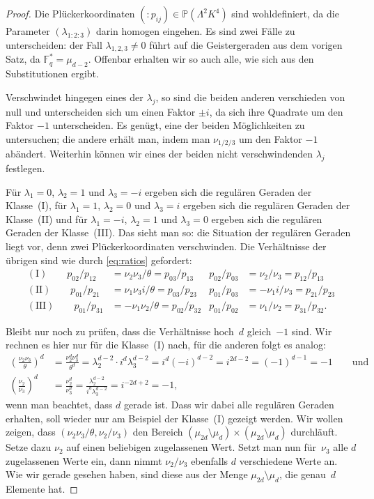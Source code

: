 \begin{proof}
Die Plückerkoordinaten $(:\!p_{ij}) \in \mathbb P(\Lambda^2 K^4)$ sind wohldefiniert, da die Parameter $(\lambda_{1:2:3})$ darin homogen eingehen. Es sind zwei Fälle zu unterscheiden: der Fall $\lambda_{1,2,3} \neq 0$ führt auf die Geistergeraden aus dem vorigen Satz, da $\mathbb F_q^* = \mu_{d-2}$. Offenbar erhalten wir so auch alle, wie sich aus den Substitutionen ergibt.

Verschwindet hingegen eines der $\lambda_j$, so sind die beiden anderen verschieden von null und unterscheiden sich um einen Faktor $\pm i$, da sich ihre Quadrate um den Faktor $-1$ unterscheiden. Es genügt, eine der beiden Möglichkeiten zu untersuchen; die andere erhält man, indem man $\nu_{1/2/3}$ um den Faktor $-1$ abändert. Weiterhin können wir eines der beiden nicht verschwindenden $\lambda_j$ festlegen.

Für $\lambda_1 = 0$, $\lambda_2 = 1$ und $\lambda_3 = -i$ ergeben sich die regulären Geraden der Klasse~(I), für $\lambda_1 = 1$, $\lambda_2 = 0$ und $\lambda_3 = i$ ergeben sich die regulären Geraden der Klasse~(II) und für $\lambda_1 = -i$, $\lambda_2 = 1$ und $\lambda_3 = 0$ ergeben sich die regulären Geraden der Klasse~(III). Das sieht man so: die Situation der regulären Geraden liegt vor, denn zwei Plückerkoordinaten verschwinden. Die Verhältnisse der übrigen sind wie durch \eqref{eq:ratios} gefordert:
\begin{align*}
\mathrm{(I)}\qquad p_{02}/p_{12} &= \nu_2 \nu_3 / \theta = p_{03}/p_{13} &p_{02}/p_{03} &= \nu_2/\nu_3 = p_{12}/p_{13} \\
\mathrm{(II)}\qquad p_{01}/p_{21} &= \nu_1 \nu_3 i/ \theta = p_{03}/p_{23} &p_{01}/p_{03} &= -\nu_1 i/\nu_3 = p_{21}/p_{23} \\
\mathrm{(III)}\qquad p_{01}/p_{31} &= -\nu_1 \nu_2/\theta = p_{02}/p_{32} &p_{01}/p_{02} &= \nu_1/\nu_2 = p_{31}/p_{32}.
\end{align*}

Bleibt nur noch zu prüfen, dass die Verhältnisse hoch~$d$ gleich~$-1$ sind. Wir rechnen es hier nur für die Klasse~(I) nach, für die anderen folgt es analog:
\begin{align*}
\left( \frac{\nu_2 \nu_3}{\theta} \right)^d &= \frac{\nu_2^d \nu_3^d}{\theta^d} = \lambda_2^{d-2} \cdot i^d \lambda_3^{d-2} = i^d (-i)^{d-2} = i^{2d-2} = (-1)^{d-1} = -1\qquad\text{und} \\
\left( \frac{\nu_2}{\nu_3} \right)^d &= \frac{\nu_2^d}{\nu_3^d} = \frac{\lambda_2^{d-2}}{i^d \lambda_3^{d-2}} = i^{-2d+2} = -1,
\end{align*}
wenn man beachtet, dass $d$ gerade ist. Dass wir dabei alle regulären Geraden erhalten, soll wieder nur am Beispiel der Klasse~(I) gezeigt werden. Wir wollen zeigen, dass $(\nu_2 \nu_3 / \theta, \nu_2 / \nu_3)$ den Bereich $(\mu_{2d} \setminus \mu_d) \times (\mu_{2d} \setminus \mu_d)$ durchläuft. Setze dazu $\nu_2$ auf einen beliebigen zugelassenen Wert. Setzt man nun für~$\nu_3$ alle $d$ zugelassenen Werte ein, dann nimmt $\nu_2 / \nu_3$ ebenfalls $d$ verschiedene Werte an. Wie wir gerade gesehen haben, sind diese aus der Menge $\mu_{2d} \setminus \mu_d$, die genau~$d$ Elemente hat.


\end{proof}

